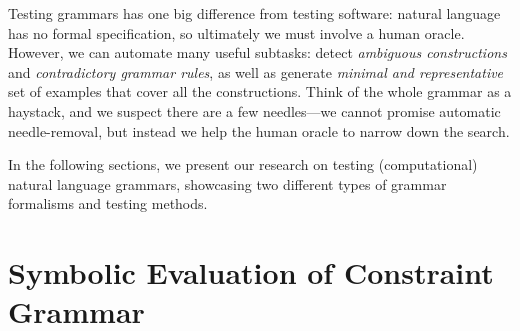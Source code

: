 \documentclass[conference]{IEEEtran}
\begin{document}



Testing grammars has one big difference from testing software: natural language has no formal specification, 
so ultimately we must involve a human oracle. However, we can automate many useful subtasks: detect \emph{ambiguous constructions} and \emph{contradictory grammar rules}, as well as generate \emph{minimal and representative} set of examples that cover all the constructions. 
Think of the whole grammar as a haystack, and we suspect there are a few needles---we cannot promise automatic needle-removal, but instead we help the human oracle to narrow down the search.

In the following sections, we present our research on testing (computational) natural language grammars, showcasing two different types of grammar formalisms and testing methods.

\section{Symbolic Evaluation of Constraint Grammar}
\end{document}
